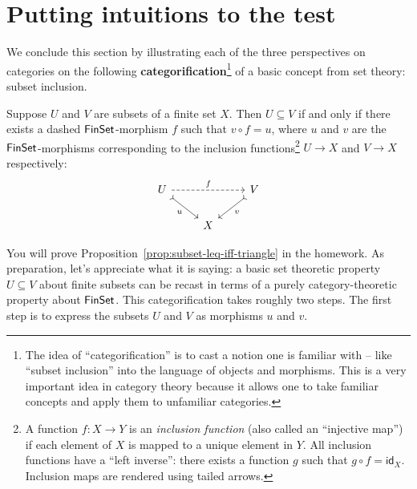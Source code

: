 \section{Putting intuitions to the test}

We conclude this section by illustrating each of the three perspectives
on categories on the following
\textbf{categorification}\footnote{The idea of ``categorification'' is to 
cast a notion one is familiar with -- like ``subset inclusion'' into 
the language of objects and morphisms. This is a very important idea 
in category theory because it allows one to take familiar concepts 
and apply them to unfamiliar categories.} of
a basic concept from set theory: subset inclusion.
\begin{proposition} \label{prop:subset-leq-iff-triangle}
Suppose \(U\) and \(V\) are subsets of a finite set \(X\).
Then \(U \subseteq V\) if and only if
there exists a dashed \(\mathsf{FinSet}\)-morphism \(f\)
such that \(v \circ f = u\),
where \(u\) and \(v\) are the \(\mathsf{FinSet}\)-morphisms
corresponding to the inclusion functions\footnote{A function $f : X \to Y$ 
is an \emph{inclusion function} (also called an ``injective map'') if 
each element of $X$ is mapped to a unique element in $Y$. 
All inclusion functions have a ``left inverse'': 
there exists a function $g$ such that $g \circ f = \mathsf{id}_X$.
Inclusion maps are rendered using tailed arrows.} \(U \to X\) and \(V \to X\)
respectively:
\begin{equation}
\begin{tikzcd}
U \arrow[rd, "u"', tail] \arrow[rr, "f", dashed] &   & V \arrow[ld, "v", tail] \\
                                                 & X &
\end{tikzcd}
\end{equation}
\end{proposition}
You will prove Proposition~\ref{prop:subset-leq-iff-triangle} in the homework.
As preparation,
let's appreciate what it is saying: a basic set theoretic
property \(U\subseteq V\) about finite subsets
can be recast in terms of a purely category-theoretic property
about \(\mathsf{FinSet}\).
This categorification takes roughly two steps.
The first step is to express the subsets \(U\) and \(V\)
as morphisms \(u\) and \(v\).
